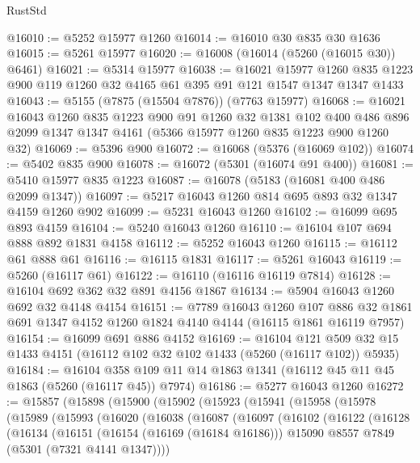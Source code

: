 \begin{lexlean}{RustStd}
\begin{coremodule}
@16010 := @5252 @15977 @1260
@16014 := @16010 @30 @835 @30 @1636
@16015 := @5261 @15977
@16020 := @16008 (@16014 (@5260 (@16015 @30)) @6461)
@16021 := @5314 @15977
@16038 := @16021
    @15977
    @1260
    @835
    @1223
    @900
    @119
    @1260
    @32
    @4165
    @61
    @395
    @91
    @121
    @1547
    @1347
    @1347
    @1433
@16043 := @5155 (@7875 (@15504 @7876)) (@7763 @15977)
@16068 := @16021
    @16043
    @1260
    @835
    @1223
    @900
    @91
    @1260
    @32
    @1381
    @102
    @400
    @486
    @896
    @2099
    @1347
    @1347
    @4161
    (@5366 @15977 @1260 @835 @1223 @900 @1260 @32)
@16069 := @5396 @900
@16072 := @16068 (@5376 (@16069 @102))
@16074 := @5402 @835 @900
@16078 := @16072 (@5301 (@16074 @91 @400))
@16081 := @5410 @15977 @835 @1223
@16087 := @16078 (@5183 (@16081 @400 @486 @2099 @1347))
@16097 := @5217 @16043 @1260 @814 @695 @893 @32 @1347 @4159 @1260 @902
@16099 := @5231 @16043 @1260
@16102 := @16099 @695 @893 @4159
@16104 := @5240 @16043 @1260
@16110 := @16104 @107 @694 @888 @892 @1831 @4158
@16112 := @5252 @16043 @1260
@16115 := @16112 @61 @888 @61
@16116 := @16115 @1831
@16117 := @5261 @16043
@16119 := @5260 (@16117 @61)
@16122 := @16110 (@16116 @16119 @7814)
@16128 := @16104 @692 @362 @32 @891 @4156 @1867
@16134 := @5904 @16043 @1260 @692 @32 @4148 @4154
@16151 := @7789
    @16043
    @1260
    @107
    @886
    @32
    @1861
    @691
    @1347
    @4152
    @1260
    @1824
    @4140
    @4144
    (@16115 @1861 @16119 @7957)
@16154 := @16099 @691 @886 @4152
@16169 := @16104
    @121
    @509
    @32
    @15
    @1433
    @4151
    (@16112 @102 @32 @102 @1433 (@5260 (@16117 @102)) @5935)
@16184 := @16104 @358 @109 @11 @14 @1863 @1341 (@16112 @45 @11 @45 @1863 (@5260 (@16117 @45)) @7974)
@16186 := @5277 @16043 @1260
@16272 := @15857
    (@15898
      (@15900
        (@15902
          (@15923
            (@15941
              (@15958
                (@15978
                  (@15989
                    (@15993
                      (@16020
                        (@16038
                          (@16087
                            (@16097
                              (@16102
                                (@16122
                                  (@16128
                                    (@16134
                                      (@16151
                                        (@16154 (@16169 (@16184 @16186)))
                                        @15090
                                        @8557
                                        @7849
                                        (@5301 (@7321 @4141 @1347))))

\end{coremodule}
\end{lexlean}
